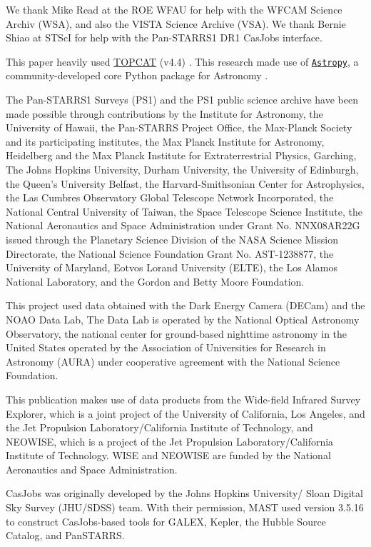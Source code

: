 \documentclass[usenatbib]{mnras}
\begin{document}
We thank Mike Read at the ROE WFAU for help with the WFCAM Science Archiv (WSA), and 
also the VISTA Science Archive (VSA). We thank Bernie Shiao at STScI for help with the Pan-STARRS1 DR1 CasJobs interface. 

This paper heavily used \href{http://www.star.bris.ac.uk/~mbt/topcat/}{TOPCAT} (v4.4)
\citep[][]{Taylor2005, Taylor2011}.
This research made use of \href{http://www.astropy.org}{\tt Astropy}, 
a community-developed core Python package for Astronomy 
\citep{AstropyCollaboration2013, AstropyCollaboration2018}. 

The Pan-STARRS1 Surveys (PS1) and the PS1 public science archive have
been made possible through contributions by the Institute for
Astronomy, the University of Hawaii, the Pan-STARRS Project Office,
the Max-Planck Society and its participating institutes, the Max
Planck Institute for Astronomy, Heidelberg and the Max Planck
Institute for Extraterrestrial Physics, Garching, The Johns Hopkins
University, Durham University, the University of Edinburgh, the
Queen's University Belfast, the Harvard-Smithsonian Center for
Astrophysics, the Las Cumbres Observatory Global Telescope Network
Incorporated, the National Central University of Taiwan, the Space
Telescope Science Institute, the National Aeronautics and Space
Administration under Grant No. NNX08AR22G issued through the Planetary
Science Division of the NASA Science Mission Directorate, the National
Science Foundation Grant No. AST-1238877, the University of Maryland,
Eotvos Lorand University (ELTE), the Los Alamos National Laboratory,
and the Gordon and Betty Moore Foundation.

This project used data obtained with the Dark Energy Camera (DECam)
and the NOAO Data Lab, The Data Lab is operated by the National
Optical Astronomy Observatory, the national center for ground-based
nighttime astronomy in the United States operated by the Association
of Universities for Research in Astronomy (AURA) under cooperative
agreement with the National Science Foundation.

This publication makes use of data products from the Wide-field
Infrared Survey Explorer, which is a joint project of the University
of California, Los Angeles, and the Jet Propulsion
Laboratory/California Institute of Technology, and NEOWISE, which is a
project of the Jet Propulsion Laboratory/California Institute of
Technology. WISE and NEOWISE are funded by the National Aeronautics
and Space Administration.

CasJobs was originally developed by the Johns Hopkins University/
Sloan Digital Sky Survey (JHU/SDSS) team. With their permission, MAST
used version 3.5.16 to construct CasJobs-based tools for GALEX,
Kepler, the Hubble Source Catalog, and PanSTARRS.
\end{document}
